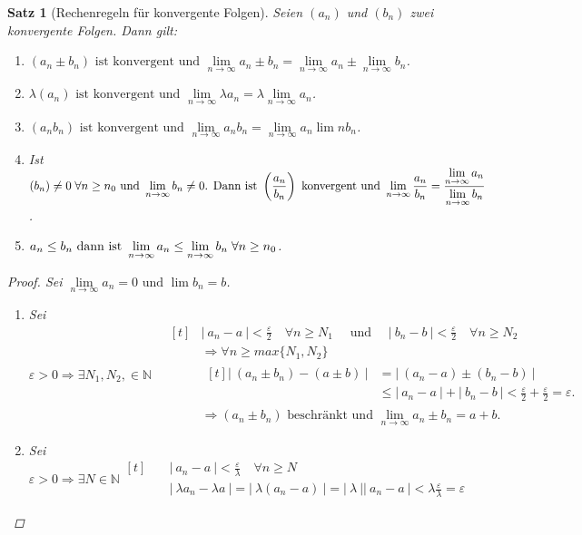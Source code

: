 \documentclass[a4paper,titlepage,oneside]{article}
\def\N{\ensuremath{\mathbb{N}} }
\renewcommand{\epsilon}{\ensuremath{\varepsilon} }
\def\sp{\hspace{0,1cm}}
\renewcommand{\liminf}[2][n]{\ensuremath{\lim\limits_{#1 \rightarrow \infty}{#2}}}
\newcommand{\abs}[1]{\ensuremath{\left|\:#1\:\right|}}
\theoremstyle{thmstyle}
\newtheorem{satz}{Satz}[subsection]
\begin{document}
\newpage
\begin{satz}[Rechenregeln für konvergente Folgen]
Seien \((a_n)\) und \((b_n)\) zwei konvergente Folgen. Dann gilt:
\begin{enumerate}
\item \((a_n \pm b_n)\text{ ist konvergent und }\liminf{a_n  \pm  b_n} = \liminf{a_n}  \pm \liminf{b_n}\).
\item \(\lambda (a_n)\text{ ist konvergent und }\liminf{\lambda a_n} = \lambda \liminf{a_n}\).
\item \((a_n b_n)\text{ ist konvergent und }\liminf{a_n b_n} = \liminf{a_n} \lim{n}{b_n}\).
\item Ist $ \displaystyle (b_n) \ne 0 \sp \forall n \ge n_0\text{ und }\liminf{b_n} \ne 0\text{. Dann ist } \left(\frac{a_n}{b_n}\right) \text{ konvergent und }\liminf{\frac{a_n}{b_n}} = \frac{\liminf{a_n}}{\liminf{b_n}}$.
\item \(a_n \le b_n \text{ dann ist }\liminf{a_n} \le \liminf{b_n} \sp \forall n \ge n_0\).
\end{enumerate}
\begin{proof}
Sei \(\liminf{a_n} = 0\text{ und } \lim{b_n} = b\).
\begin{enumerate}
\item Sei $\epsilon > 0 \Rightarrow \exists N_1, N_2, \in \N \quad
\begin{aligned}[t]
&\abs{a_n - a} < \frac{\epsilon}{2} \quad \forall n \ge N_1 \quad \text{ und } \quad  \abs{b_n - b} < \frac{\epsilon}{2} \quad \forall n \ge N_2\\
&\Rightarrow \forall n \ge max\{N_1, N_2\}\\
& \begin{aligned}[t]
\abs{(a_n \pm b_n) - (a \pm b)} &= \abs{(a_n - a) \pm (b_n - b)} \\
&\le \abs{a_n - a} + \abs{b_n - b} < \frac{\epsilon}{2} + \frac{\epsilon}{2} = \epsilon.
\end{aligned}\\
&\Rightarrow (a_n \pm b_n) \text{ beschränkt und } \liminf{a_n \pm b_n} = a+b.
\end{aligned}$
\item Sei $ \displaystyle \epsilon > 0 \Rightarrow \exists N \in \N \begin{aligned}[t] \quad
		&\abs{a_n - a} < \frac{\epsilon}{\lambda} \quad \forall n \ge N\\
		& \abs{\lambda a_n - \lambda a} = \abs{\lambda(a_n - a)} = \abs{\lambda}\abs{a_n - a} < \lambda \frac{\epsilon}{\lambda} = \epsilon
		\end{aligned}$

\end{enumerate}
\end{proof}
\end{satz}
\end{document}
